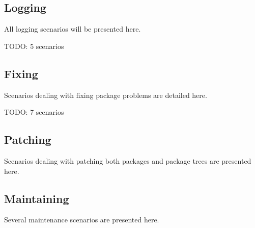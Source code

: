 

%


\subsection{Logging}
All logging scenarios will be presented here.

TODO: 5 scenarios
%
%
%
%
%


\subsection{Fixing}
Scenarios dealing with fixing package problems are detailed here.

TODO: 7 scenarios
%
%
%
%
%
%
%


\subsection{Patching}
Scenarios dealing with patching both packages and package trees are presented here.





\subsection{Maintaining}
Several maintenance scenarios are presented here.






